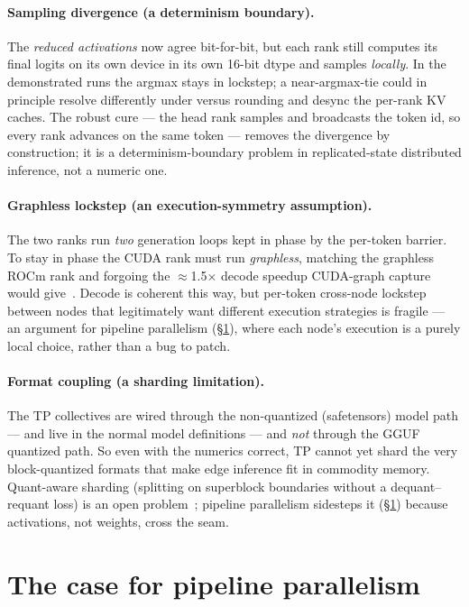 \documentclass[11pt]{article}
\begin{document}
\paragraph{Sampling divergence (a determinism boundary).} The \emph{reduced activations} now agree
bit-for-bit, but each rank still computes its final logits on its own device in its own 16-bit dtype and
samples \emph{locally}. In the demonstrated runs the argmax stays in lockstep; a near-argmax-tie could in
principle resolve differently under  versus  rounding and desync the per-rank KV
caches. The robust cure --- the head rank samples and broadcasts the token id, so every rank advances on
the same token --- removes the divergence by construction; it is a determinism-boundary problem in
replicated-state distributed inference, not a numeric one.

\paragraph{Graphless lockstep (an execution-symmetry assumption).} The two ranks run \emph{two}
generation loops kept in phase by the per-token  barrier. To stay in phase the CUDA rank
must run \emph{graphless}, matching the graphless ROCm rank and forgoing the $\approx$1.5$\times$ decode
speedup CUDA-graph capture would give~\cite{backend}. Decode is coherent this way, but per-token
cross-node lockstep between nodes that legitimately want different execution strategies is fragile --- an
argument for pipeline parallelism (\S\ref{sec:pipeline}), where each node's execution is a purely local
choice, rather than a bug to patch.

\paragraph{Format coupling (a sharding limitation).} The TP collectives are wired through the
non-quantized (safetensors) model path ---  and  live in
the normal model definitions --- and \emph{not} through the GGUF quantized path. So even with the
numerics correct, TP cannot yet shard the very block-quantized formats that make edge inference fit in
commodity memory. Quant-aware sharding (splitting on superblock boundaries without a dequant--requant
loss) is an open problem~\cite{openproblems}; pipeline parallelism sidesteps it (\S\ref{sec:pipeline})
because activations, not weights, cross the seam.

\section{The case for pipeline parallelism}
\label{sec:pipeline}
\end{document}
